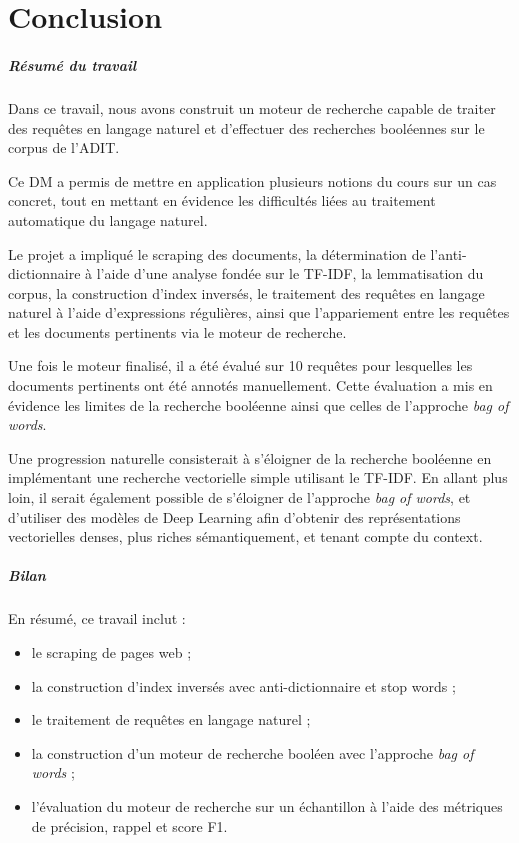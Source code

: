 \chapter*{Conclusion}

\paragraph{Résumé du travail}

Dans ce travail, nous avons construit un moteur de recherche capable de traiter des requêtes en langage naturel et d'effectuer des recherches booléennes sur le corpus de l'ADIT.

Ce DM a permis de mettre en application plusieurs notions du cours sur un cas concret, tout en mettant en évidence les difficultés liées au traitement automatique du langage naturel.

Le projet a impliqué le scraping des documents, la détermination de l'anti-dictionnaire à l'aide d'une analyse fondée sur le TF-IDF, la lemmatisation du corpus, la construction d'index inversés, le traitement des requêtes en langage naturel à l'aide d'expressions régulières, ainsi que l'appariement entre les requêtes et les documents pertinents via le moteur de recherche.

Une fois le moteur finalisé, il a été évalué sur 10 requêtes pour lesquelles les documents pertinents ont été annotés manuellement. Cette évaluation a mis en évidence les limites de la recherche booléenne ainsi que celles de l'approche \textit{bag of words}.

Une progression naturelle consisterait à s'éloigner de la recherche booléenne en implémentant une recherche vectorielle simple utilisant le TF-IDF. En allant plus loin, il serait également possible de s'éloigner de l'approche \textit{bag of words}, et d'utiliser des modèles de Deep Learning afin d'obtenir des représentations vectorielles denses, plus riches sémantiquement, et tenant compte du context.

\paragraph{Bilan}

En résumé, ce travail inclut :

\begin{itemize}
    \item le scraping de pages web ;
    \item la construction d'index inversés avec anti-dictionnaire et stop words ;
    \item le traitement de requêtes en langage naturel ;
    \item la construction d'un moteur de recherche booléen avec l'approche \textit{bag of words} ;
    \item l'évaluation du moteur de recherche sur un échantillon à l'aide des métriques de précision, rappel et score F1.
\end{itemize}

